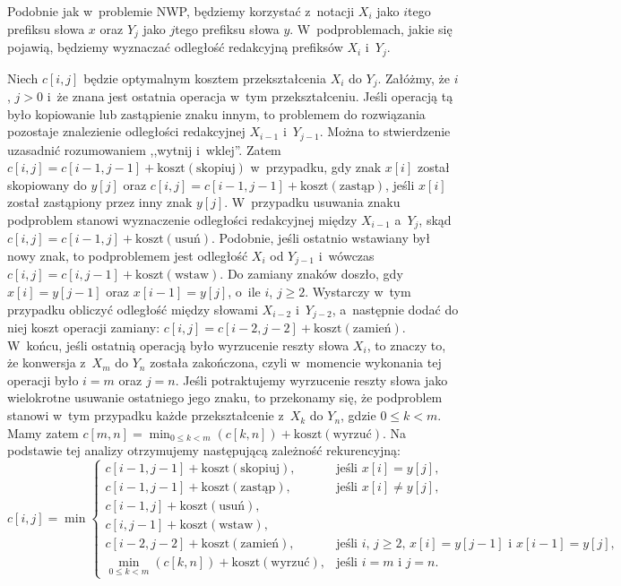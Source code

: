 
\subproblem %
Podobnie jak w~problemie NWP, będziemy korzystać z~notacji $X_i$ jako $i$\nbhyphen tego prefiksu słowa $x$ oraz $Y_j$ jako $j$\nbhyphen tego prefiksu słowa $y$.
W~podproblemach, jakie się pojawią, będziemy wyznaczać odległość redakcyjną prefiksów $X_i$ i~$Y_j$.

Niech $c[i,j]$ będzie optymalnym kosztem przekształcenia $X_i$ do $Y_j$.
Załóżmy, że $i$, $j>0$ i~że znana jest ostatnia operacja w~tym przekształceniu.
Jeśli operacją tą było kopiowanie lub zastąpienie znaku innym, to problemem do rozwiązania pozostaje znalezienie odległości redakcyjnej $X_{i-1}$ i~$Y_{j-1}$.
Można to stwierdzenie uzasadnić rozumowaniem ,,wytnij i~wklej''.
Zatem $c[i,j]=c[i-1,j-1]+\mathrm{koszt}(\text{skopiuj})$ w~przypadku, gdy znak $x[i]$ został skopiowany  do $y[j]$ oraz $c[i,j]=c[i-1,j-1]+\mathrm{koszt}(\text{zastąp})$, jeśli $x[i]$ został zastąpiony przez inny znak $y[j]$.
W~przypadku usuwania znaku podproblem stanowi wyznaczenie odległości redakcyjnej między $X_{i-1}$ a~$Y_j$, skąd $c[i,j]=c[i-1,j]+\mathrm{koszt}(\text{usuń})$.
Podobnie, jeśli ostatnio wstawiany był nowy znak, to podproblemem jest odległość $X_i$ od $Y_{j-1}$ i~wówczas $c[i,j]=c[i,j-1]+\mathrm{koszt}(\text{wstaw})$.
Do zamiany znaków doszło, gdy $x[i]=y[j-1]$ oraz $x[i-1]=y[j]$, o~ile $i$, $j\ge2$.
Wystarczy w~tym przypadku obliczyć odległość między słowami $X_{i-2}$ i~$Y_{j-2}$, a~następnie dodać do niej koszt operacji zamiany: $c[i,j]=c[i-2,j-2]+\mathrm{koszt}(\text{zamień})$.
W~końcu, jeśli ostatnią operacją było wyrzucenie reszty słowa $X_i$, to znaczy to, że konwersja z~$X_m$ do $Y_n$ została zakończona, czyli w~momencie wykonania tej operacji było $i=m$ oraz $j=n$.
Jeśli potraktujemy wyrzucenie reszty słowa jako wielokrotne usuwanie ostatniego jego znaku, to przekonamy się, że podproblem stanowi w~tym przypadku każde przekształcenie z~$X_k$ do $Y_n$, gdzie $0\le k<m$.
Mamy zatem $c[m,n]=\min_{0\le k<m}(c[k,n])+\mathrm{koszt}(\text{wyrzuć})$.
Na podstawie tej analizy otrzymujemy następującą zależność rekurencyjną:
\[
	c[i,j] = \min\begin{cases}
		c[i-1,j-1]+\mathrm{koszt}(\text{skopiuj}), & \text{jeśli $x[i]=y[j]$}, \\
		c[i-1,j-1]+\mathrm{koszt}(\text{zastąp}), & \text{jeśli $x[i]\ne y[j]$}, \\
		c[i-1,j]+\mathrm{koszt}(\text{usuń}), \\
		c[i,j-1]+\mathrm{koszt}(\text{wstaw}), \\
		c[i-2,j-2]+\mathrm{koszt}(\text{zamień}), & \text{jeśli $i$, $j\ge2$, $x[i]=y[j-1]$ i~$x[i-1]=y[j]$}, \\
		\displaystyle\min_{0\le k<m}(c[k,n])+\mathrm{koszt}(\text{wyrzuć}), & \text{jeśli $i=m$ i~$j=n$}.
	\end{cases}
\]

